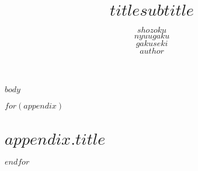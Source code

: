 \documentclass[a4paper,11pt]{jsreport}
\title{\Large $title$\newline{\ddash}$subtitle${\ddash}}
\author{$shozoku$\\$nyuugaku$\\$gakuseki$\\$author$}
\date{}
\begin{document}
\maketitle


\tableofcontents

$body$

\printbibliography[title = 参考文献]


\appendix

$for(appendix)$
\chapter{$appendix.title$}

$endfor$
\end{document}
